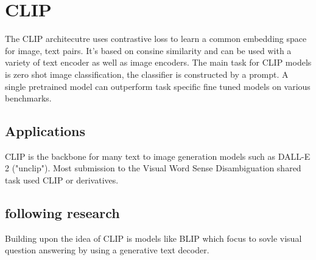 \documentclass[11pt,a4paper]{article}
\begin{document}
\section{CLIP} %
The CLIP \cite{radford2021learning} architecutre uses contrastive loss to learn a common embedding space for image, text pairs.
It's based on consine similarity and can be used with a variety of text encoder as well as image encoders. 
The main task for CLIP models is zero shot image classification, the classifier is constructed by a prompt.
A single pretrained model can outperform task specific fine tuned models on various benchmarks.


\subsection{Applications} %
CLIP is the backbone for many text to image generation models such as DALL-E 2 \cite{ramesh2022hierarchical} ("unclip").
Most submission to the Visual Word Sense Disambiguation \cite{raganato-etal-2023-semeval} shared task used CLIP or derivatives.

\subsection{following research} %
Building upon the idea of CLIP is models like BLIP\cite{li2022blip} which focus to sovle visual question answering by using a generative text decoder.





\appendix
\end{document}
